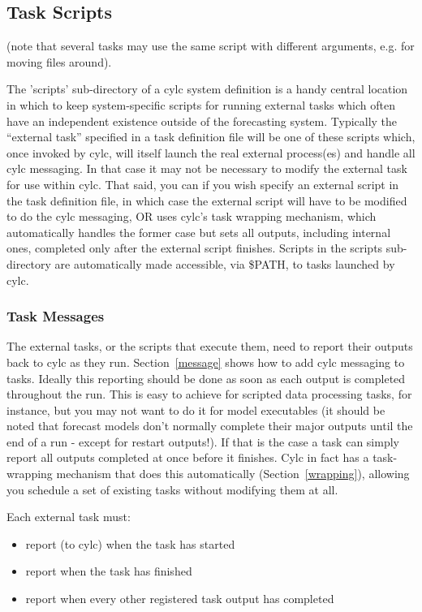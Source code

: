 \documentclass[11pt,a4paper]{article}
\begin{document}
\pagebreak
\subsection{Task Scripts}
\label{TaskScripts}

(note that several tasks may use the same script with different
arguments, e.g. for moving files around).

The 'scripts' sub-directory of a cylc system definition is a handy
central location in which to keep system-specific scripts for running
external tasks which often have an independent existence outside of the
forecasting system. Typically the ``external task'' specified in a task
definition file will be one of these scripts which, once invoked by
cylc, will itself launch the real external process(es) and handle all
cylc messaging. In that case it may not be necessary to modify the
external task for use within cylc.  That said, you can if you wish
specify an external script in the task definition file, in which case 
the external script will have to be modified to do the cylc messaging,
OR uses cylc's task wrapping mechanism, which automatically handles the
former case but sets all outputs, including internal ones, completed
only after the external script finishes.  Scripts in the scripts
sub-directory are automatically made accessible, via \$PATH, to tasks
launched by cylc. 

\subsubsection{Task Messages}

The external tasks, or the scripts that execute them, need to report
their outputs back to cylc as they run. Section~\ref{message} shows
how to add cylc messaging to tasks.  Ideally this reporting should be
done as soon as each output is completed throughout the run. This is
easy to achieve for scripted data processing tasks, for instance, but
you may not want to do it for model executables (it should be noted that
forecast models don't normally complete their major outputs until the
end of a run - except for restart outputs!). If that is the case a task
can simply report all outputs completed at once before it finishes.
Cylc in fact has a task-wrapping mechanism that does this automatically
(Section~\ref{wrapping}), allowing you schedule a set of existing
tasks without modifying them at all.  

Each external task must:

\begin{itemize}
\item report (to cylc) when the task has started
\item report when the task has finished
\item report when every other registered task output has
completed
\end{itemize}
\end{document}
